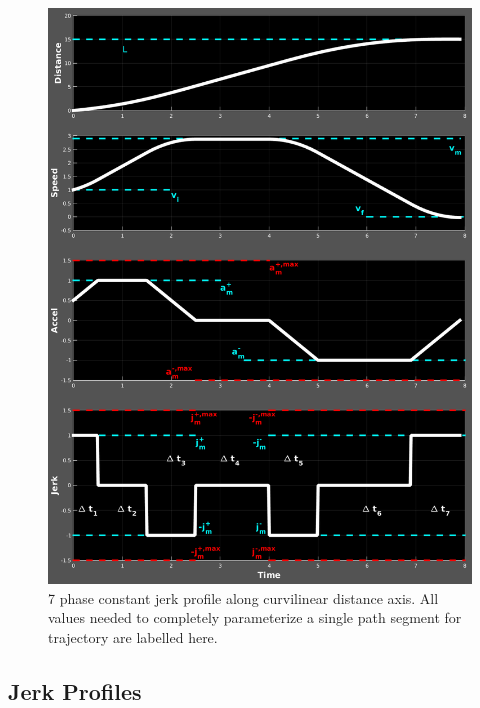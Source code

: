 \documentclass[letterpaper, 10 pt, conference]{ieeeconf}  %
\begin{document}
\begin{figure}[thpb]
  \centering
  \includegraphics[width=1.0\columnwidth]{graphics/Full7PhaseSpecVertical.png}
  \caption{7 phase constant jerk profile along curvilinear distance axis. All values needed to completely parameterize a single path segment for trajectory are labelled here.}
  \label{fig:full7phasespec}
\end{figure}


\subsection{Jerk Profiles} \label{sec:jerkprofiles}
\end{document}
